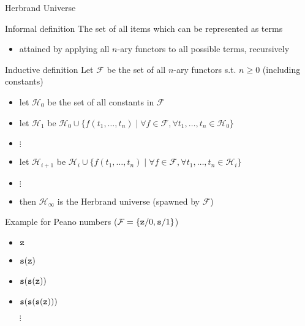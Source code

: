 \documentclass[presentation]{beamer}\mode<presentation>{\usetheme{AMSBolognaFC}}
\begin{document}
\begin{frame}[allowframebreaks]{Herbrand Universe}
    \begin{block}{Informal definition}
        The set of all items which can be represented as terms
        \begin{itemize}
            \item attained by applying all $n$-ary functors to all possible terms, recursively
        \end{itemize}
    \end{block}

    \begin{alertblock}{Inductive definition}
        Let $\mathcal{F}$ be the set of all $n$-ary functors s.t. $n \geq 0$ (including constants)
        \begin{itemize}
            \item let $\mathcal{H}_0$ be the set of all constants in $\mathcal{F}$
            \item let $\mathcal{H}_1$ be $\mathcal{H}_0 \cup \{ f(t_1, \ldots, t_n) \mid \forall f \in \mathcal{F}, \forall t_1, \ldots, t_n \in \mathcal{H}_0 \}$
            \item $\vdots$
            \item let $\mathcal{H}_{i+1}$ be $\mathcal{H}_i \cup \{ f(t_1, \ldots, t_n) \mid \forall f \in \mathcal{F}, \forall t_1, \ldots, t_n \in \mathcal{H}_i \}$
            \item $\vdots$
            \item then $\mathcal{H}_\infty$ is the Herbrand universe (spawned by $\mathcal{F}$)
        \end{itemize}
    \end{alertblock}

    \framebreak

    \begin{exampleblock}{Example for Peano numbers ($\mathcal{F} = \{ \mathtt{z}/0, \mathtt{s}/1 \}$)}
        \begin{itemize}
            \item $\mathtt{z}$
            \item $\mathtt{s}(\mathtt{z})$
            \item $\mathtt{s}(\mathtt{s}(\mathtt{z}))$
            \item $\mathtt{s}(\mathtt{s}(\mathtt{s}(\mathtt{z})))$
            \item[$\vdots$]
        \end{itemize}
    \end{exampleblock}


\end{frame}
\end{document}
